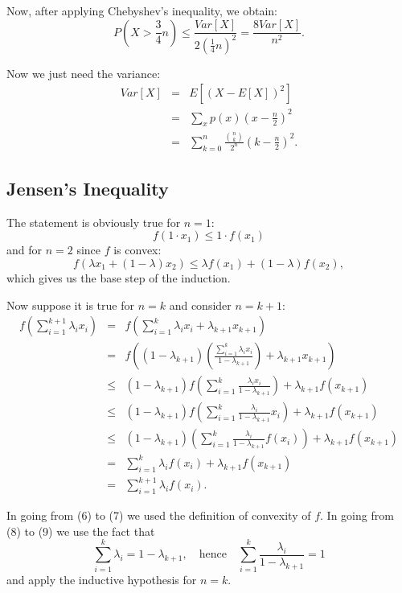 Now, after applying Chebyshev's inequality, we obtain:
\[
  P\left( X > \frac{3}{4}n \right) 
    \leq \frac{Var[X]}{2 \left(\frac{1}{4}n\right)^2}
    = \frac{8Var[X]}{n^2}.
\]

Now we just need the variance:
\begin{eqnarray*}
  Var[X] & = & E[(X-E[X])^2] \\
         & = & \sum_xp(x)\left(x-\frac{n}{2}\right)^2 \\
         & = & \sum_{k=0}^n\frac{\binom{n}{k}}{2^n}\left(k-\frac{n}{2}\right)^2.
\end{eqnarray*}


\subsection{Jensen's Inequality}
The statement is obviously true for $n=1$: 
$$ f(1\cdot x_1) \leq 1\cdot f(x_1)$$ and for $n=2$ since $f$ is convex:
$$ f(\lambda x_1 + (1-\lambda)x_2) \leq \lambda f(x_1) + (1-\lambda)f(x_2),$$
which gives us the base step of the induction.

Now suppose it is true for $n=k$ and consider $n=k+1$:
\begin{eqnarray}
  f\left(\sum_{i=1}^{k+1}\lambda_ix_i\right) 
    &=& f\left(\sum_{i=1}^{k}\lambda_ix_i+\lambda_{k+1}x_{k+1}\right) \\
    &=& f\left((1-\lambda_{k+1})\left(\frac{\sum_{i=1}^{k}\lambda_ix_i}{1-\lambda_{k+1}}\right)+\lambda_{k+1}x_{k+1}\right) \\
    &\leq& (1-\lambda_{k+1})f\left(\sum_{i=1}^k\frac{\lambda_ix_i}{1-\lambda_{k+1}}\right) + \lambda_{k+1}f(x_{k+1}) \\
    &\leq& (1-\lambda_{k+1})f\left(\sum_{i=1}^k\frac{\lambda_i}{1-\lambda_{k+1}}x_i\right) + \lambda_{k+1}f(x_{k+1}) \\
    &\leq& (1-\lambda_{k+1})\left(\sum_{i=1}^k\frac{\lambda_i}{1-\lambda_{k+1}}f(x_i)\right) + \lambda_{k+1}f(x_{k+1}) \\
    &=& \sum_{i=1}^k\lambda_if(x_i) + \lambda_{k+1}f(x_{k+1}) \\
    &=& \sum_{i=1}^{k+1}\lambda_if(x_i).
\end{eqnarray}

In going from (6) to (7) we used the definition of convexity of $f$. 
In going from (8) to (9) we use the fact that 
$$ \sum_{i=1}^k\lambda_i = 1 - \lambda_{k+1}, \quad \text{hence} \quad
\sum_{i=1}^k\frac{\lambda_i}{1-\lambda_{k+1}}=1$$ and apply the inductive 
hypothesis for $n=k$.
